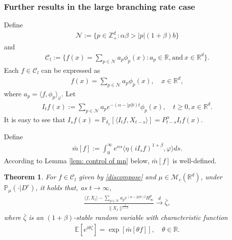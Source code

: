 \documentclass[12pt,a4paper]{amsart}
\theoremstyle{plain}
\newtheorem{thm}{Theorem}[section]
\theoremstyle{definition}
\numberwithin{equation}{section}
\begin{document}
\subsubsection{Further results in the large branching rate case}
Define
\begin{align}
   \mathcal{N}:=\{p\in \mathbb{Z}_+^d:  \alpha\beta>|p|(1+\beta)b\}
\end{align}
and
\begin{align}
    \mathcal{C}_l:=\Big\{f(x)=\sum_{p\in\mathcal{N}}a_p\phi_p(x): a_p\in \mathbb{R}, \text{and}~ x\in\mathbb{R}^d \Big\}.
\end{align}
Each $f\in \mathcal{C}_l$ can be expressed as
\begin{align}\label{discompose}
    f(x)=\sum_{p\in \mathcal{N}}a_p\phi_p(x),\quad x\in \mathbb{R}^d,
\end{align}
where $a_p=\langle f, \phi_p\rangle_{\varphi}$. Let
\begin{align}\label{definition of Itf}
    I_tf(x):=\sum_{p\in \mathcal{N}}a_pe^{-(\alpha-|p|b)t}\phi_p(x), \quad t\geq 0, x\in \mathbb{R}^d.
\end{align}
It is easy to see that $I_sf(x)=\mathbb{P}_{\delta_x}[\langle I_t f, X_{t-s}\rangle]=P_{t-s}^{\alpha}I_tf(x)$.

Define
\begin{align}\label{bar-m}
   \bar{m}[f]:=\int_{0}^{\infty} e^{\alpha s}\langle \eta(iI_sf)^{1+\beta},\varphi\rangle ds.
\end{align}
According to Lemma \ref{lem: control of mn} below, $\bar{m}[f]$ is well-defined.
\begin{thm}\label{theorem 1.6}
For $f\in\mathcal{C}_l$ given by \eqref{discompose} and $\mu\in \mathcal{M}_c(\mathbb{R}^d)$, under $\mathbb{P}_{\mu}(\cdot|D^c)$, it holds that, as $t\to\infty$,
\begin{align}\label{thm: large rate}
    \frac{\langle f, X_t\rangle-\sum_{p\in\mathcal{N}}a_pe^{(\alpha-|p|b)t}H^p_{\infty}}{\|X_t\|^\frac{1}{1+\beta}}\xrightarrow{d}\bar{\zeta},
\end{align}
where $\bar{\zeta}$ is an $(1+\beta)$-stable random variable with characteristic function
\begin{align}
    \mathbb{E}[e^{i\theta\bar{\zeta}}]=\exp[\bar{m}[\theta f]],\quad \theta\in \mathbb{R}.
\end{align}
\end{thm}
\end{document}

